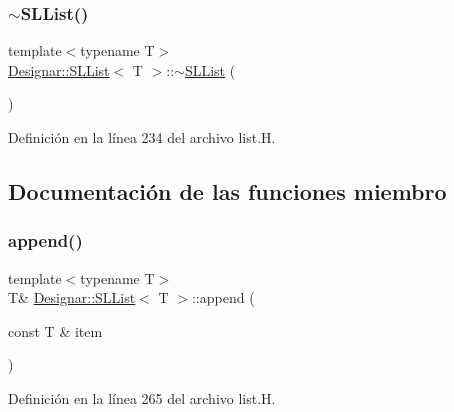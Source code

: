 \mbox{\label{class_designar_1_1_s_l_list_a129557e3a5b4555ac45ccae8aaa89f03}} 
\subsubsection{\texorpdfstring{$\sim$\+S\+L\+List()}{~SLList()}}
{\footnotesize\ttfamily template$<$typename T$>$ \\
\hyperlink{class_designar_1_1_s_l_list}{Designar\+::\+S\+L\+List}$<$ T $>$\+::$\sim$\hyperlink{class_designar_1_1_s_l_list}{S\+L\+List} (\begin{DoxyParamCaption}{ }\end{DoxyParamCaption})\hspace{0.3cm}{\ttfamily [inline]}}



Definición en la línea 234 del archivo list.\+H.



\subsection{Documentación de las funciones miembro}
\mbox{\label{class_designar_1_1_s_l_list_ae2df2707dddd8c7af8e8d878e1fb58fa}} 
\subsubsection{\texorpdfstring{append()}{append()}\hspace{0.1cm}{\footnotesize\ttfamily [1/2]}}
{\footnotesize\ttfamily template$<$typename T$>$ \\
T\& \hyperlink{class_designar_1_1_s_l_list}{Designar\+::\+S\+L\+List}$<$ T $>$\+::append (\begin{DoxyParamCaption}\item[{const T \&}]{item }\end{DoxyParamCaption})\hspace{0.3cm}{\ttfamily [inline]}}



Definición en la línea 265 del archivo list.\+H.

